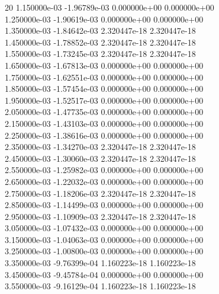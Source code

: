 20	1.150000e-03	-1.96789e-03	0.000000e+00	0.000000e+00	\\ 	1.250000e-03	-1.90619e-03	0.000000e+00	0.000000e+00	\\ 	1.350000e-03	-1.84642e-03	2.320447e-18	2.320447e-18	\\ 	1.450000e-03	-1.78852e-03	2.320447e-18	2.320447e-18	\\ 	1.550000e-03	-1.73245e-03	2.320447e-18	2.320447e-18	\\ 	1.650000e-03	-1.67813e-03	0.000000e+00	0.000000e+00	\\ 	1.750000e-03	-1.62551e-03	0.000000e+00	0.000000e+00	\\ 	1.850000e-03	-1.57454e-03	0.000000e+00	0.000000e+00	\\ 	1.950000e-03	-1.52517e-03	0.000000e+00	0.000000e+00	\\ 	2.050000e-03	-1.47735e-03	0.000000e+00	0.000000e+00	\\ 	2.150000e-03	-1.43103e-03	0.000000e+00	0.000000e+00	\\ 	2.250000e-03	-1.38616e-03	0.000000e+00	0.000000e+00	\\ 	2.350000e-03	-1.34270e-03	2.320447e-18	2.320447e-18	\\ 	2.450000e-03	-1.30060e-03	2.320447e-18	2.320447e-18	\\ 	2.550000e-03	-1.25982e-03	0.000000e+00	0.000000e+00	\\ 	2.650000e-03	-1.22032e-03	0.000000e+00	0.000000e+00	\\ 	2.750000e-03	-1.18206e-03	2.320447e-18	2.320447e-18	\\ 	2.850000e-03	-1.14499e-03	0.000000e+00	0.000000e+00	\\ 	2.950000e-03	-1.10909e-03	2.320447e-18	2.320447e-18	\\ 	3.050000e-03	-1.07432e-03	0.000000e+00	0.000000e+00	\\ 	3.150000e-03	-1.04063e-03	0.000000e+00	0.000000e+00	\\ 	3.250000e-03	-1.00800e-03	0.000000e+00	0.000000e+00	\\ 	3.350000e-03	-9.76399e-04	1.160223e-18	1.160223e-18	\\ 	3.450000e-03	-9.45784e-04	0.000000e+00	0.000000e+00	\\ 	3.550000e-03	-9.16129e-04	1.160223e-18	1.160223e-18	\\ \hline
